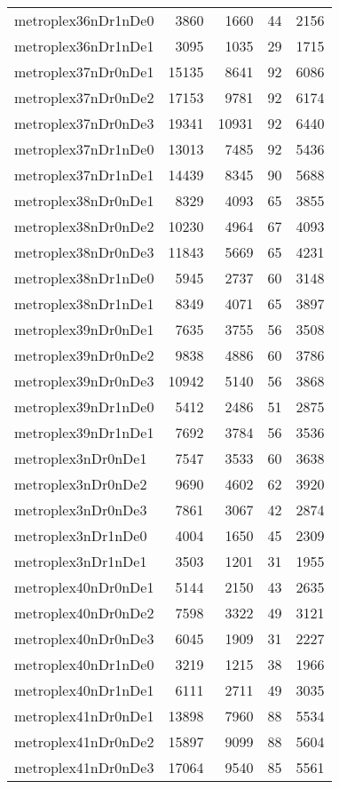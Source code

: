 \begin{longtable}{lrrrr}
metroplex36nDr1nDe0 & 3860 & 1660 & 44 & 2156 \\
metroplex36nDr1nDe1 & 3095 & 1035 & 29 & 1715 \\
metroplex37nDr0nDe1 & 15135 & 8641 & 92 & 6086 \\
metroplex37nDr0nDe2 & 17153 & 9781 & 92 & 6174 \\
metroplex37nDr0nDe3 & 19341 & 10931 & 92 & 6440 \\
metroplex37nDr1nDe0 & 13013 & 7485 & 92 & 5436 \\
metroplex37nDr1nDe1 & 14439 & 8345 & 90 & 5688 \\
metroplex38nDr0nDe1 & 8329 & 4093 & 65 & 3855 \\
metroplex38nDr0nDe2 & 10230 & 4964 & 67 & 4093 \\
metroplex38nDr0nDe3 & 11843 & 5669 & 65 & 4231 \\
metroplex38nDr1nDe0 & 5945 & 2737 & 60 & 3148 \\
metroplex38nDr1nDe1 & 8349 & 4071 & 65 & 3897 \\
metroplex39nDr0nDe1 & 7635 & 3755 & 56 & 3508 \\
metroplex39nDr0nDe2 & 9838 & 4886 & 60 & 3786 \\
metroplex39nDr0nDe3 & 10942 & 5140 & 56 & 3868 \\
metroplex39nDr1nDe0 & 5412 & 2486 & 51 & 2875 \\
metroplex39nDr1nDe1 & 7692 & 3784 & 56 & 3536 \\
metroplex3nDr0nDe1 & 7547 & 3533 & 60 & 3638 \\
metroplex3nDr0nDe2 & 9690 & 4602 & 62 & 3920 \\
metroplex3nDr0nDe3 & 7861 & 3067 & 42 & 2874 \\
metroplex3nDr1nDe0 & 4004 & 1650 & 45 & 2309 \\
metroplex3nDr1nDe1 & 3503 & 1201 & 31 & 1955 \\
metroplex40nDr0nDe1 & 5144 & 2150 & 43 & 2635 \\
metroplex40nDr0nDe2 & 7598 & 3322 & 49 & 3121 \\
metroplex40nDr0nDe3 & 6045 & 1909 & 31 & 2227 \\
metroplex40nDr1nDe0 & 3219 & 1215 & 38 & 1966 \\
metroplex40nDr1nDe1 & 6111 & 2711 & 49 & 3035 \\
metroplex41nDr0nDe1 & 13898 & 7960 & 88 & 5534 \\
metroplex41nDr0nDe2 & 15897 & 9099 & 88 & 5604 \\
metroplex41nDr0nDe3 & 17064 & 9540 & 85 & 5561 \\

\end{longtable}
